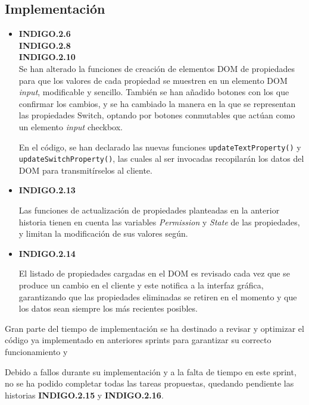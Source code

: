 \newpage

\subsection{Implementación}

\begin{itemize}[leftmargin=10mm]
	\item \textbf{INDIGO.2.6}\\
	\textbf{INDIGO.2.8}\\
	\textbf{INDIGO.2.10}\\
	Se han alterado la funciones de creación de elementos DOM de propiedades para que los valores de cada propiedad se muestren en un elemento DOM \textit{input}, modificable y sencillo. También se han añadido botones con los que confirmar los cambios, y se ha cambiado la manera en la que se representan las propiedades Switch, optando por botones conmutables que actúan como un elemento \textit{input} checkbox.
	
	En el código, se han declarado las nuevas funciones \texttt{updateTextProperty()} y \texttt{updateSwitchProperty()}, las cuales al ser invocadas recopilarán los datos del DOM para transmitírselos al cliente.
	
	\item \textbf{INDIGO.2.13}
	
	Las funciones de actualización de propiedades planteadas en la anterior historia tienen en cuenta las variables \textit{Permission} y \textit{State} de las propiedades, y limitan la modificación de sus valores según.
	
	\item \textbf{INDIGO.2.14}
	
	El listado de propiedades cargadas en el DOM es revisado cada vez que se produce un cambio en el cliente y este notifica a la interfaz gráfica, garantizando que las propiedades eliminadas se retiren en el momento y que los datos sean siempre los más recientes posibles.
	
\end{itemize}

Gran parte del tiempo de implementación se ha destinado a revisar y optimizar el código ya implementado en anteriores sprints para garantizar su correcto funcionamiento y 

Debido a fallos durante su implementación y a la falta de tiempo en este sprint, no se ha podido completar todas las tareas propuestas, quedando pendiente las historias \textbf{INDIGO.2.15} y \textbf{INDIGO.2.16}. 

